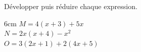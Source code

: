 \documentclass[a4paper]{book}
\begin{document}
    \vspace{0.5cm}
        
    \begin{exercice}
        Développer puis réduire chaque expression.
        \vspace{0.3cm}
        
        \begin{ZoneReponse}{6cm}
            $M = 4(x + 3) + 5x$ \\
            \vspace{0.2cm}
            $N = 2x(x + 4) - x^2$ \\
            \vspace{0.2cm}
            $O = 3(2x + 1) + 2(4x + 5)$
            \end{ZoneReponse}
    \end{exercice}
\end{document}
